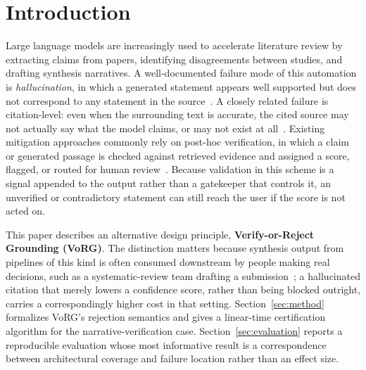 \documentclass[11pt]{article}
\begin{document}
\section{Introduction}

Large language models are increasingly used to accelerate literature review by
extracting claims from papers, identifying disagreements between studies, and
drafting synthesis narratives. A well-documented failure mode of this automation
is \emph{hallucination}, in which a generated statement appears well supported
but does not correspond to any statement in the
source~\cite{zhang2025hallucination,ji2023survey,tonmoy2024comprehensive}. A
closely related failure is citation-level: even when the surrounding text is
accurate, the cited source may not actually say what the model claims, or may
not exist at all~\cite{zhang2025citation}. Existing mitigation approaches
commonly rely on post-hoc verification, in which a claim or generated passage is
checked against retrieved evidence and assigned a score, flagged, or routed for
human review~\cite{li2025enhancing}. Because validation in this scheme is a
signal appended to the output rather than a gatekeeper that controls it, an
unverified or contradictory statement can still reach the user if the score is
not acted on.

This paper describes an alternative design principle, \textbf{Verify-or-Reject
Grounding (VoRG)}. The distinction matters because synthesis output from
pipelines of this kind is often consumed downstream by people making real
decisions, such as a systematic-review team drafting a
submission~\cite{li2025enhancing}; a hallucinated citation that merely lowers a
confidence score, rather than being blocked outright, carries a correspondingly
higher cost in that setting. Section~\ref{sec:method} formalizes VoRG's
rejection semantics and gives a linear-time certification algorithm for the
narrative-verification case. Section~\ref{sec:evaluation} reports a reproducible
evaluation whose most informative result is a correspondence between
architectural coverage and failure location rather than an effect size.
\end{document}
